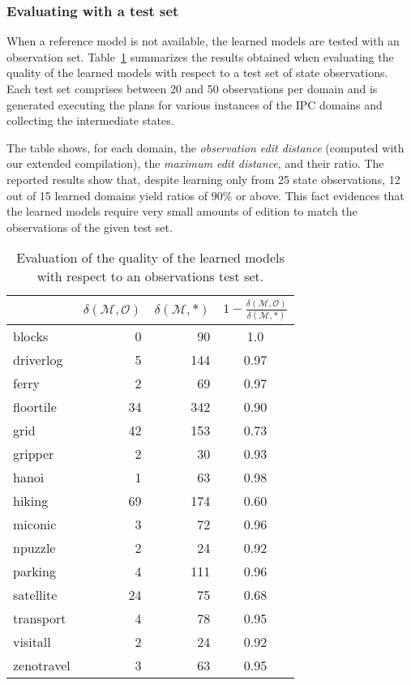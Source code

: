 \documentclass[3p,times]{elsarticle}
\begin{document}
\subsubsection{Evaluating with a test set}

When a reference model is not available, the learned models are tested with an observation set. Table~\ref{fig:observationstest} summarizes the results obtained when evaluating the quality of the learned models with respect to a test set of state observations. Each test set comprises between 20 and 50 observations per domain and is generated executing the plans for various instances of the IPC domains and collecting the intermediate states.

The table shows, for each domain, the {\em observation edit distance} (computed with our extended compilation), the {\em maximum edit distance}, and their ratio. The reported results show that, despite learning only from 25 state observations, 12 out of 15 learned domains yield ratios of $90\%$ or above. This fact evidences that the learned models require very small amounts of edition to match the observations of the given test set.

\begin{table}[hbt!]
		\begin{center}
                \begin{footnotesize}
			\begin{tabular}{l|r|r|c|}
				& $\delta(\mathcal{M},\mathcal{O})$ & $\delta(\mathcal{M},*)$ & $1-\frac{\delta(\mathcal{M},\mathcal{O})}{\delta(\mathcal{M},*)}$ \\
				\hline
				blocks & 0 & 90 & 1.0 \\
				driverlog & 5 & 144 & 0.97 \\
				ferry & 2 & 69 & 0.97 \\
				floortile & 34 & 342 & 0.90 \\
				grid & 42 & 153 & 0.73 \\
				gripper & 2 & 30 & 0.93 \\
				hanoi & 1 & 63 & 0.98 \\
				hiking & 69 & 174 & 0.60 \\
				miconic & 3 & 72 & 0.96 \\
				npuzzle & 2 & 24 & 0.92 \\
                                parking & 4 & 111 & 0.96 \\
				satellite & 24 & 75 & 0.68 \\
				transport & 4 & 78 & 0.95 \\
				visitall & 2 & 24 & 0.92 \\
				zenotravel & 3 & 63 & 0.95
			\end{tabular}
                        	\end{footnotesize}
		\end{center}
	\caption{\small Evaluation of the quality of the learned models with respect to an observations test set.}
	\label{fig:observationstest}
\end{table}
\end{document}
